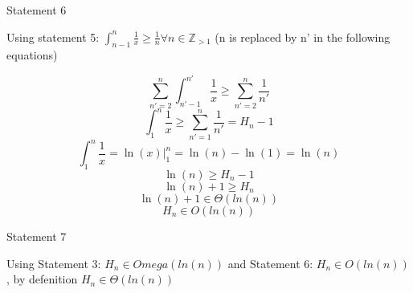 \documentclass{report}
\begin{document}
Statement 6\\
{\center
	Using statement 5: $\int_{n-1}^{n}\frac{1}{x} \geq \frac{1}{n} \forall n \in \mathbb{Z}_{>1}$ (n is replaced by n' in the following equations)\par
}
$$\sum_{n'=2}^{n}\int_{n'-1}^{n'}\frac{1}{x} \geq \sum_{n'=2}^{n}\frac{1}{n'}$$
$$\int_{1}^{n}\frac{1}{x} \geq \sum_{n'=1}^{n}\frac{1}{n'} = H_n - 1$$
$$\int_{1}^{n}\frac{1}{x} = \ln(x)|_1^{n} = \ln(n) - \ln(1) = \ln(n)$$
$$\ln(n) \geq H_n - 1$$
$$\ln(n) + 1 \geq H_n$$
$$\ln(n) + 1 \in \Theta(ln(n))$$
$$H_n \in O(ln(n))$$


Statement 7\\
{\center
Using Statement 3: $H_n \in Omega(ln(n))$ and Statement 6: $H_n \in O(ln(n))$, by defenition $H_n \in \Theta(ln(n))$\par
}
\end{document}
